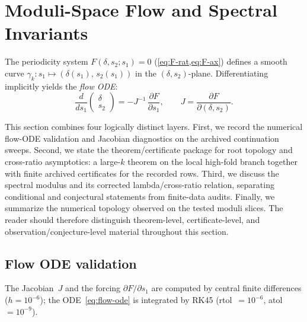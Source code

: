 \documentclass[11pt,a4paper]{article}
\theoremstyle{plain}
\theoremstyle{definition}
\theoremstyle{remark}
\begin{document}
\section{Moduli-Space Flow and Spectral Invariants}\label{sec:flow}

The periodicity system $F(\delta, s_2; s_1) = 0$
(\cref{eq:F-rat,eq:F-ax}) defines a smooth curve
$\gamma_k : s_1 \mapsto (\delta(s_1),\, s_2(s_1))$
in the $(\delta, s_2)$-plane.  Differentiating implicitly yields
the \emph{flow ODE}:
\begin{equation}
  \frac{d}{ds_1}\begin{pmatrix}\delta \\ s_2\end{pmatrix}
  = -J^{-1}\,\frac{\partial F}{\partial s_1},
  \qquad
  J = \frac{\partial F}{\partial(\delta, s_2)}.
  \label{eq:flow-ode}
\end{equation}

This section combines four logically distinct layers.  First, we record
the numerical flow-ODE validation and Jacobian diagnostics on the
archived continuation sweeps.  Second, we state the theorem/certificate
package for root topology and cross-ratio asymptotics: a large-$k$
theorem on the local high-fold branch together with finite archived
certificates for the recorded rows.  Third, we discuss the spectral
modulus and its corrected lambda/cross-ratio relation, separating
conditional and conjectural statements from finite-data audits.
Finally, we summarize the numerical topology observed on the tested
moduli slices.  The reader should therefore distinguish theorem-level,
certificate-level, and observation/conjecture-level material throughout
this section.

\subsection{Flow ODE validation}\label{sec:flow-val}

The Jacobian~$J$ and the forcing $\partial F/\partial s_1$ are
computed by central finite differences ($h = 10^{-6}$);
the ODE~\eqref{eq:flow-ode} is integrated by RK45
(rtol~$= 10^{-6}$, atol~$= 10^{-9}$).
\end{document}

